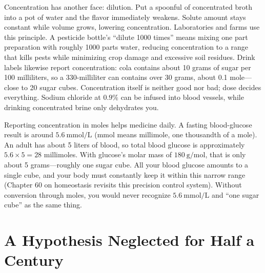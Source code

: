 Concentration has another face: dilution. Put a spoonful of concentrated broth into a pot of water and the flavor immediately weakens. Solute amount stays constant while volume grows, lowering concentration. Laboratories and farms use this principle. A pesticide bottle's ``dilute 1000 times'' means mixing one part preparation with roughly 1000 parts water, reducing concentration to a range that kills pests while minimizing crop damage and excessive soil residues. Drink labels likewise report concentration: cola contains about 10 grams of sugar per 100 milliliters, so a 330-milliliter can contains over 30 grams, about 0.1 mole---close to 20 sugar cubes. Concentration itself is neither good nor bad; dose decides everything. Sodium chloride at $0.9\%$ can be infused into blood vessels, while drinking concentrated brine only dehydrates you.

Reporting concentration in moles helps medicine daily. A fasting blood-glucose result is around $5.6\ \mathrm{mmol/L}$ (mmol means millimole, one thousandth of a mole). An adult has about 5 liters of blood, so total blood glucose is approximately $5.6\times 5=28$ millimoles. With glucose's molar mass of $180\ \mathrm{g/mol}$, that is only about 5 grams---roughly one sugar cube. All your blood glucose amounts to a single cube, and your body must constantly keep it within this narrow range (Chapter 60 on homeostasis revisits this precision control system). Without conversion through moles, you would never recognize $5.6\ \mathrm{mmol/L}$ and ``one sugar cube'' as the same thing.

\section{A Hypothesis Neglected for Half a Century}

